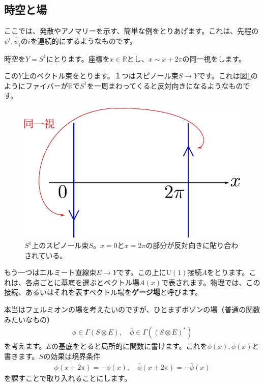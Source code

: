 \documentclass[paper=a4, fontsize=12pt, line_length=16cm, number_of_lines=33,dvipdfmx]{jlreq}
\numberwithin{equation}{section}
\newcommand{\Rb}{\mathbb{R}}
\newcommand{\strong}[1]{\textsf{\bfseries #1}}
\newcommand{\psib}{\bar{\psi}}
\newcommand{\phib}{\bar{\phi}}
\newcommand{\U}{\mathrm{U}}
\begin{document}
\subsection{時空と場}
ここでは、発散やアノマリーを示す、簡単な例をとりあげます。これは、先程の$\psi^{i},\psib_{i}$の$i$を連続的にするようなものです。

時空を$Y=S^1$にとります。座標を$x\in \Rb$とし、$x\sim x+2\pi$の同一視をします。

この$Y$上のベクトル束をとります。１つはスピノール束$S\to Y$です。これは図\ref{fig:spinor1d}のようにファイバーが$\Rb$で$S^1$を一周まわってくると反対向きになるようなものです。
\begin{figure}[htbp]
  \centering
  \includegraphics{spinor1d.pdf}
  \caption{$S^1$上のスピノール束$S$。$x=0$と$x=2\pi$の部分が反対向きに貼り合わされている。}
  \label{fig:spinor1d}
\end{figure}


もう一つはエルミート直線束$E\to Y$です。この上に$\U(1)$接続$A$をとります。これは、各点ごとに基底を選ぶとベクトル場$A(x)$で表されます。物理では、この接続、あるいはそれを表すベクトル場を\strong{ゲージ場}と呼びます。

本当はフェルミオンの場を考えたいのですが、ひとまずボゾンの場（普通の関数みたいなもの）
\begin{align}
  \phi\in \Gamma(S\otimes E),\quad \phib \in \Gamma((S\otimes E)^{*})
\end{align}
を考えます。$E$の基底をとると局所的に関数に書けます。これを$\phi(x),\phib(x)$と書きます。$S$の効果は境界条件
\begin{align}
  \phi(x+2\pi)=-\phi(x),\quad \phib(x+2\pi)=-\phib(x)\label{NSBC}
\end{align}
を課すことで取り入れることにします。
\end{document}
